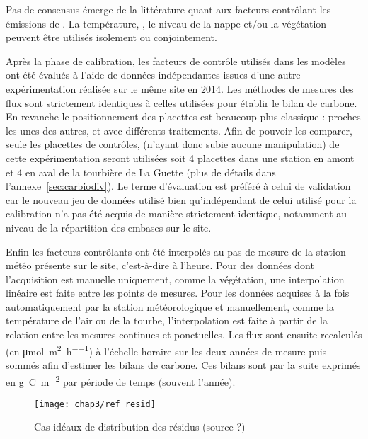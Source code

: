 Pas de consensus émerge de la littérature quant aux facteurs contrôlant les émissions de \chh.
La température, \citep{alm1999,bubier1995}, le niveau de la nappe \citep{bubier1993} et/ou la végétation \citep{bortoluzzi2006} peuvent être utilisés isolement ou conjointement.

Après la phase de calibration, les facteurs de contrôle utilisés dans les modèles ont été évalués à l'aide de données indépendantes issues d'une autre expérimentation réalisée sur le même site en 2014.
Les méthodes de mesures des flux sont strictement identiques à celles utilisées pour établir le bilan de carbone.
En revanche le positionnement des placettes est beaucoup plus classique : proches les unes des autres, et avec différents traitements.
Afin de pouvoir les comparer, seule les placettes de contrôles, (n'ayant donc subie aucune manipulation) de cette expérimentation seront utilisées soit 4 placettes dans une station en amont et 4 en aval de la tourbière de La Guette (plus de détails dans l'annexe~\ref{sec:carbiodiv}).
Le terme d'évaluation est préféré à celui de validation car le nouveau jeu de données utilisé bien qu'indépendant de celui utilisé pour la calibration n'a pas été acquis de manière strictement identique, notamment au niveau de la répartition des embases sur le site.

Enfin les facteurs contrôlants ont été interpolés au pas de mesure de la station météo présente sur le site, c'est-à-dire à l'heure.
Pour des données dont l'acquisition est manuelle uniquement, comme la végétation, une interpolation linéaire est faite entre les points de mesures.
Pour les données acquises à la fois automatiquement par la station météorologique et manuellement, comme la température de l'air ou de la tourbe, l'interpolation est faite à partir de la relation entre les mesures continues et ponctuelles.
Les flux sont ensuite recalculés (en \si{\micro\mole\per\square\meter\per\hour}) à l'échelle horaire sur les deux années de mesure puis sommés afin d'estimer les bilans de carbone.
Ces bilans sont par la suite exprimés en \si{\gram C m^{-2}} par période de temps (souvent l'année).

\begin{figure}
\centering
\texttt{[image: chap3/ref\_resid]}
\caption{Cas idéaux de distribution des résidus (source ?)}
\label{fig:ref_resid}
\end{figure}


